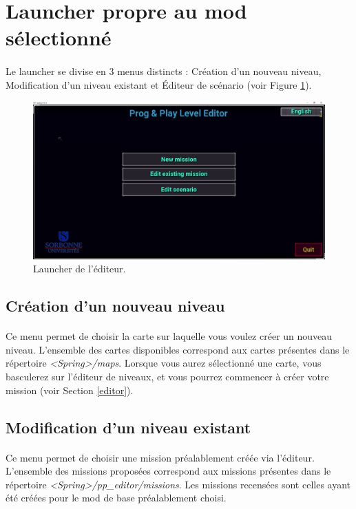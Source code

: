 \documentclass[a4paper]{article}
\begin{document}
\section{Launcher propre au mod sélectionné}\label{launcher}
\paragraph{ }
Le launcher se divise en 3 menus distincts : Création d'un nouveau niveau, Modification d'un niveau existant et Éditeur de scénario (voir Figure \ref{fig:launcher-main}).
\begin{figure}[H]
\centering
\includegraphics[width=\linewidth]{launcher-main.png}
\caption{Launcher de l'éditeur.}
\label{fig:launcher-main}
\end{figure}
\subsection{Création d'un nouveau niveau}
\paragraph{ }
Ce menu permet de choisir la carte sur laquelle vous voulez créer un nouveau niveau. L'ensemble des cartes disponibles correspond aux cartes présentes dans le répertoire \textit{<Spring>/maps}. Lorsque vous aurez sélectionné une carte, vous basculerez sur l'éditeur de niveaux, et vous pourrez commencer à créer votre mission (voir Section \ref{editor}).
\subsection{Modification d'un niveau existant}
\paragraph{ }
Ce menu permet de choisir une mission préalablement créée via l'éditeur. L'ensemble des missions proposées correspond aux missions présentes dans le répertoire \textit{<Spring>/pp\_editor/missions}. Les missions recensées sont celles ayant été créées pour le mod de base préalablement choisi.
\end{document}
